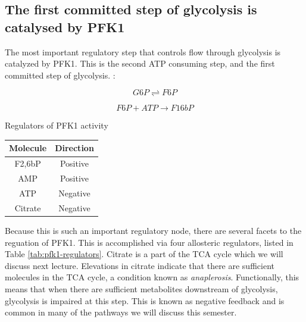 \documentclass{tufte-handout}
\begin{document}
\subsection{The first committed step of glycolysis is catalysed by PFK1}

The most important regulatory step that controls flow through glycolysis is catalyzed by PFK1.  This is the second ATP consuming step, and the first committed step of glycolysis.  :

\begin{equation}\label{eq:pgm}
G6P \rightleftharpoons F6P
\end{equation}

\begin{equation}\label{eq:pfk1}
F6P + ATP \rightarrow F16bP
\end{equation}

\begin{margintable}
\centering
\caption{Regulators of PFK1 activity}
\label{tab:pfk1-regulators}
\begin{tabular}{cc}
\hline
\textbf {Molecule} & \textbf{Direction}  \\
\hline
F2,6bP & Positive \\
AMP & Positive \\
ATP & Negative \\
Citrate & Negative \\
\hline
\end{tabular}
\end{margintable}

Because this is such an important regulatory node, there are several facets to the reguation of PFK1.  This is accomplished via four allosteric regulators, listed in Table \ref{tab:pfk1-regulators}.  Citrate is a part of the TCA cycle which we will discuss next lecture.  Elevations in citrate indicate that there are sufficient molecules in the TCA cycle, a condition known as \emph{anaplerosis}.  Functionally, this means that when there are sufficient metabolites downstream of glycolysis, glycolysis is impaired at this step.  This is known as negative feedback and is common in many of the pathways we will discuss this semester.
\end{document}
